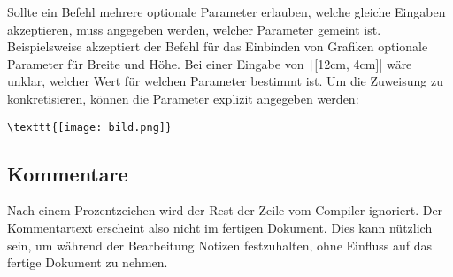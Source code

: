 \begin{table}[h!]
	\caption{Beispiele für \LaTeX-Befehle}
	\label{tbl:latex-commands}
\end{table}

Sollte ein Befehl mehrere optionale Parameter erlauben, welche gleiche Eingaben akzeptieren, muss angegeben werden, welcher Parameter gemeint ist. Beispielsweise akzeptiert der Befehl für das Einbinden von Grafiken optionale Parameter für Breite und Höhe. Bei einer Eingabe von \texttt|[12cm, 4cm]| wäre unklar, welcher Wert für welchen Parameter bestimmt ist. Um die Zuweisung zu konkretisieren, können die Parameter explizit angegeben werden:
\begin{verbatim}
\texttt{[image: bild.png]}
\end{verbatim}

\subsection{Kommentare}
\label{sub:kommentare}
Nach einem Prozentzeichen wird der Rest der Zeile vom Compiler ignoriert. Der Kommentartext erscheint also nicht im fertigen Dokument. Dies kann nützlich sein, um während der Bearbeitung Notizen festzuhalten, ohne Einfluss auf das fertige Dokument zu nehmen. 

